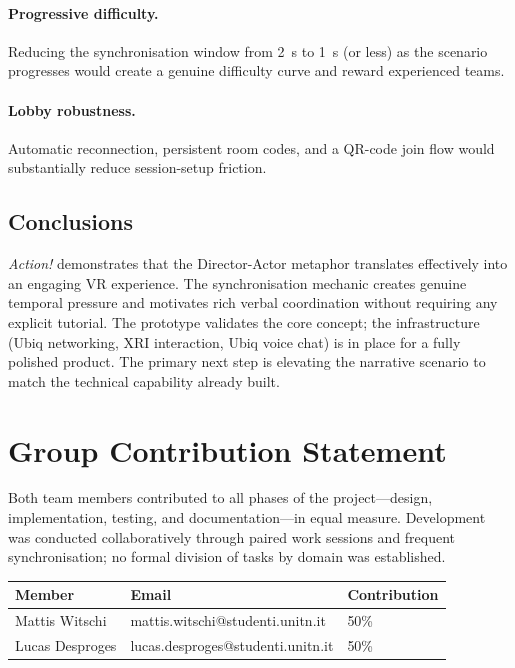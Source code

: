 \documentclass[12pt,a4paper]{article}
\begin{document}
\paragraph{Progressive difficulty.}
Reducing the synchronisation window from 2~s to 1~s (or less) as the scenario progresses would create a genuine difficulty curve and reward experienced teams.

\paragraph{Lobby robustness.}
Automatic reconnection, persistent room codes, and a QR-code join flow would substantially reduce session-setup friction.

\subsection{Conclusions}

\textit{Action!} demonstrates that the Director-Actor metaphor translates effectively into an engaging VR experience. The synchronisation mechanic creates genuine temporal pressure and motivates rich verbal coordination without requiring any explicit tutorial. The prototype validates the core concept; the infrastructure (Ubiq networking, XRI interaction, Ubiq voice chat) is in place for a fully polished product. The primary next step is elevating the narrative scenario to match the technical capability already built.

\newpage
\section*{Group Contribution Statement}

Both team members contributed to all phases of the project---design, implementation, testing, and documentation---in equal measure. Development was conducted collaboratively through paired work sessions and frequent synchronisation; no formal division of tasks by domain was established.

\begin{center}
\begin{tabular}{@{}lll@{}}
  \toprule
  \textbf{Member} & \textbf{Email} & \textbf{Contribution} \\
  \midrule
  Mattis Witschi  & mattis.witschi@studenti.unitn.it  & 50\% \\
  Lucas Desproges & lucas.desproges@studenti.unitn.it & 50\% \\
  \bottomrule
\end{tabular}
\end{center}
\end{document}
